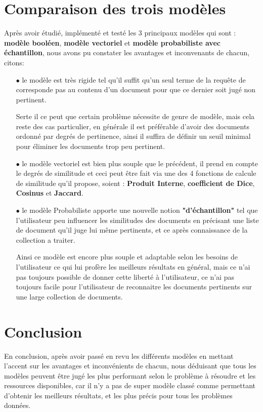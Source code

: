 \documentclass[12pt,a4paper,oneside]{article}
\begin{document}
\section{Comparaison des trois modèles}
Après avoir étudié, implémenté et testé les 3 principaux modèles qui sont : \textbf{modèle booléen}, \textbf{modèle vectoriel} et \textbf{modèle probabiliste avec échantillon}, nous avons pu constater les avantages et inconvenants de chacun, citons:
\begin{itemize}
	\item[$\bullet$] le modèle est très rigide tel qu'il suffit qu'un seul terme de la requête de corresponde pas au contenu d'un document pour que ce dernier soit jugé non pertinent.
	
	Serte il ce peut que certain problème nécessite de genre de modèle, mais cela reste des cas particulier, en générale il est préférable d'avoir des documents ordonné par degrés de pertinence, ainsi il suffira de définir un seuil minimal pour éliminer les documents trop peu pertinent.
	
	\item[$\bullet$] le modèle vectoriel est bien plus souple que le précédent, il prend en compte le degrés de similitude et ceci peut être fait via une des 4 fonctions de calcule de similitude qu'il propose, soient : \textbf{Produit Interne}, \textbf{coefficient de Dice}, \textbf{Cosinus} et \textbf{Jaccard}.
	
	\item[$\bullet$] le modèle Probabiliste apporte une nouvelle notion \textbf{"d'échantillon"} tel que l'utilisateur peu influencer les similitudes des documents en précisant une liste de document qu'il juge lui même pertinents, et ce après connaissance de la collection a traiter.
	
	Ainsi ce modèle est encore plus souple et adaptable selon les besoins de l'utilisateur ce qui lui profère les meilleurs résultats en général, mais ce n'ai pas toujours possible de donner cette liberté à l'utilisateur, ce n'ai pas toujours facile pour l'utilisateur de reconnaitre les documents pertinents sur une large collection de documents.
\end{itemize}


\newpage

\section*{Conclusion}
En conclusion, après avoir passé en revu les différents modèles en mettant l'accent sur les avantages et inconvénients de chacun, nous déduisant que tous les modèles peuvent être jugé les plus performant selon le problème à résoudre et les ressources disponibles, car il n'y a pas de super modèle classé comme permettant d'obtenir les meilleurs résultats, et les plus précis pour tous les problèmes données.\\
\end{document}
